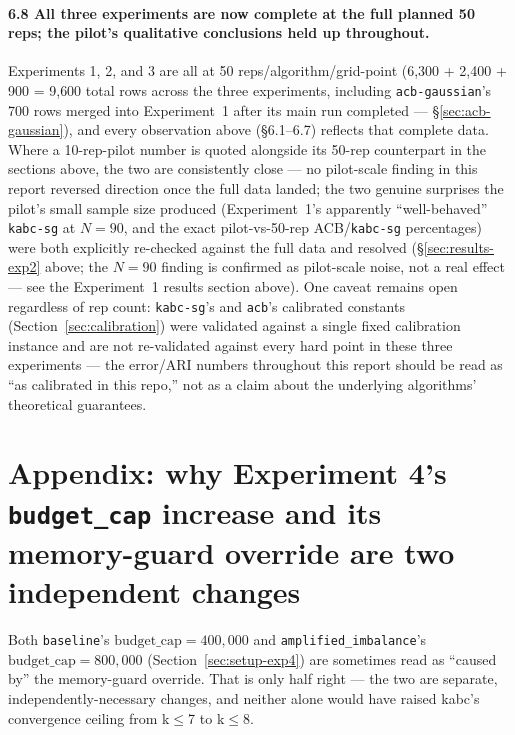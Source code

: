 \documentclass[11pt]{article}
\begin{document}
\paragraph{6.8 All three experiments are now complete at the full planned
50 reps; the pilot's qualitative conclusions held up throughout.}
Experiments 1, 2, and 3 are all at 50 reps/algorithm/grid-point (6{,}300 +
2{,}400 + 900 = 9{,}600 total rows across the three experiments, including
\texttt{acb-gaussian}'s 700 rows merged into Experiment~1 after its main
run completed --- \S\ref{sec:acb-gaussian}), and every observation above
(\S6.1--6.7) reflects that complete data. Where a
10-rep-pilot number is quoted alongside its 50-rep counterpart in the
sections above, the two are consistently close --- no pilot-scale finding
in this report reversed direction once the full data landed; the two
genuine surprises the pilot's small sample size produced (Experiment~1's
apparently ``well-behaved'' \texttt{kabc-sg} at $N=90$, and the exact
pilot-vs-50-rep ACB/\texttt{kabc-sg} percentages) were both explicitly
re-checked against the full data and resolved (\S\ref{sec:results-exp2}
above; the $N=90$ finding is confirmed as pilot-scale noise, not a real
effect --- see the Experiment~1 results section above). One caveat
remains open regardless of rep count: \texttt{kabc-sg}'s and
\texttt{acb}'s calibrated constants (Section~\ref{sec:calibration}) were
validated against a single fixed calibration instance and are not
re-validated against every hard point in these three experiments --- the
error/ARI numbers throughout this report should be read as ``as
calibrated in this repo,'' not as a claim about the underlying
algorithms' theoretical guarantees.

\FloatBarrier
\section{Appendix: why Experiment 4's \texttt{budget\_cap} increase and its memory-guard override are two independent changes}
\label{sec:appendix-exp4-budget-vs-guard}

Both \texttt{baseline}'s $\text{budget\_cap}=400{,}000$ and
\texttt{amplified\_imbalance}'s $\text{budget\_cap}=800{,}000$
(Section~\ref{sec:setup-exp4}) are sometimes read as ``caused by'' the
memory-guard override. That is only half right --- the two are separate,
independently-necessary changes, and neither alone would have raised
kabc's convergence ceiling from k$\le$7 to k$\le$8.
\end{document}

